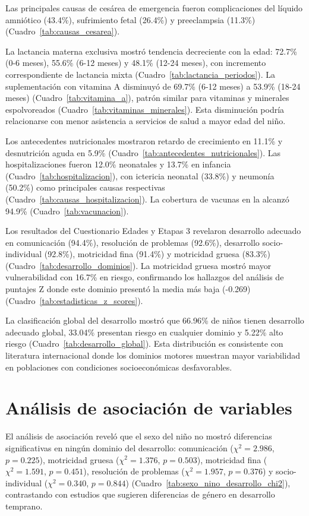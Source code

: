 \documentclass[11pt,letterpaper]{report}
\begin{document}
Las principales causas de cesárea de emergencia fueron complicaciones del 
líquido amniótico (43.4\%), sufrimiento fetal (26.4\%) y preeclampsia (11.3\%) 
(Cuadro~\ref{tab:causas_cesarea}).

La lactancia materna exclusiva mostró tendencia decreciente con la edad: 72.7\% 
(0-6 meses), 55.6\% (6-12 meses) y 48.1\% (12-24 meses), con incremento 
correspondiente de lactancia mixta (Cuadro~\ref{tab:lactancia_periodos}). La 
suplementación con vitamina A disminuyó de 69.7\% (6-12 meses) a 53.9\% 
(18-24 meses) (Cuadro~\ref{tab:vitamina_a}), patrón similar para vitaminas y 
minerales espolvoreados (Cuadro~\ref{tab:vitaminas_minerales}). Esta 
disminución podría relacionarse con menor asistencia a servicios de salud a 
mayor edad del niño.

Los antecedentes nutricionales mostraron retardo de crecimiento en 11.1\% y 
desnutrición aguda en 5.9\% (Cuadro~\ref{tab:antecedentes_nutricionales}). 
Las hospitalizaciones fueron 12.0\% neonatales y 13.7\% en infancia 
(Cuadro~\ref{tab:hospitalizacion}), con ictericia neonatal (33.8\%) y neumonía 
(50.2\%) como principales causas respectivas 
(Cuadro~\ref{tab:causas_hospitalizacion}). La cobertura de vacunas en la alcanzó
94.9\% (Cuadro~\ref{tab:vacunacion}).

Los resultados del Cuestionario Edades y Etapas 3 revelaron desarrollo adecuado
en comunicación (94.4\%),  resolución de problemas (92.6\%), desarrollo
socio-individual (92.8\%),  motricidad fina (91.4\%) y motricidad gruesa
(83.3\%)  (Cuadro~\ref{tab:desarrollo_dominios}). La motricidad gruesa mostró
mayor  vulnerabilidad con 16.7\% en riesgo, confirmando los hallazgos del
análisis de puntajes Z donde este dominio presentó la media más baja (-0.269) 
(Cuadro~\ref{tab:estadisticas_z_scores}).

La clasificación global del desarrollo mostró que 66.96\% de niños tienen 
desarrollo adecuado global, 33.04\% presentan riesgo en cualquier dominio y 
5.22\% alto riesgo (Cuadro~\ref{tab:desarrollo_global}). Esta distribución es 
consistente con literatura internacional donde los dominios motores muestran 
mayor variabilidad en poblaciones con condiciones socioeconómicas 
desfavorables.

\section{Análisis de asociación de variables}
El análisis de asociación reveló que el sexo del niño no mostró diferencias 
significativas en ningún dominio del desarrollo: comunicación 
($\chi^2 = 2.986$, $p = 0.225$), motricidad gruesa ($\chi^2 = 1.376$, 
$p = 0.503$), motricidad fina ($\chi^2 = 1.591$, $p = 0.451$), resolución 
de problemas ($\chi^2 = 1.957$, $p = 0.376$) y socio-individual 
($\chi^2 = 0.340$, $p = 0.844$) (Cuadro~\ref{tab:sexo_nino_desarrollo_chi2}), 
contrastando con estudios que sugieren diferencias de género en desarrollo 
temprano.
\end{document}
